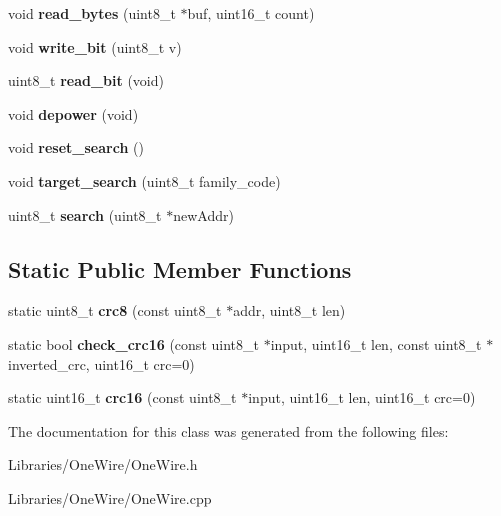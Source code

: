\begin{DoxyCompactItemize}
\item 
\hypertarget{class_one_wire_a2407440e8e25b624617593f8ad6447d4}{}void {\bfseries read\+\_\+bytes} (uint8\+\_\+t $\ast$buf, uint16\+\_\+t count)\label{class_one_wire_a2407440e8e25b624617593f8ad6447d4}

\item 
\hypertarget{class_one_wire_a6bbc58276d1cb08653dab3ea35378f94}{}void {\bfseries write\+\_\+bit} (uint8\+\_\+t v)\label{class_one_wire_a6bbc58276d1cb08653dab3ea35378f94}

\item 
\hypertarget{class_one_wire_aeae4c2798b70d9d0ba3091c03ee2d056}{}uint8\+\_\+t {\bfseries read\+\_\+bit} (void)\label{class_one_wire_aeae4c2798b70d9d0ba3091c03ee2d056}

\item 
\hypertarget{class_one_wire_aa8e0f62e830ad05d8035e55c7a309256}{}void {\bfseries depower} (void)\label{class_one_wire_aa8e0f62e830ad05d8035e55c7a309256}

\item 
\hypertarget{class_one_wire_aae5efdf67928b5ee312ab7d7906416fa}{}void {\bfseries reset\+\_\+search} ()\label{class_one_wire_aae5efdf67928b5ee312ab7d7906416fa}

\item 
\hypertarget{class_one_wire_a0a1b8457adb609a693b865dd474e5116}{}void {\bfseries target\+\_\+search} (uint8\+\_\+t family\+\_\+code)\label{class_one_wire_a0a1b8457adb609a693b865dd474e5116}

\item 
\hypertarget{class_one_wire_a383dc74fc9f8a27b76366a2859c3820a}{}uint8\+\_\+t {\bfseries search} (uint8\+\_\+t $\ast$new\+Addr)\label{class_one_wire_a383dc74fc9f8a27b76366a2859c3820a}

\end{DoxyCompactItemize}
\subsection*{Static Public Member Functions}
\begin{DoxyCompactItemize}
\item 
\hypertarget{class_one_wire_ae3486a669581b750e4fdf3f3a12b05f1}{}static uint8\+\_\+t {\bfseries crc8} (const uint8\+\_\+t $\ast$addr, uint8\+\_\+t len)\label{class_one_wire_ae3486a669581b750e4fdf3f3a12b05f1}

\item 
\hypertarget{class_one_wire_a089c502d26caca5214264261db82d011}{}static bool {\bfseries check\+\_\+crc16} (const uint8\+\_\+t $\ast$input, uint16\+\_\+t len, const uint8\+\_\+t $\ast$inverted\+\_\+crc, uint16\+\_\+t crc=0)\label{class_one_wire_a089c502d26caca5214264261db82d011}

\item 
\hypertarget{class_one_wire_a685131803ff9bd250926de68fb477998}{}static uint16\+\_\+t {\bfseries crc16} (const uint8\+\_\+t $\ast$input, uint16\+\_\+t len, uint16\+\_\+t crc=0)\label{class_one_wire_a685131803ff9bd250926de68fb477998}

\end{DoxyCompactItemize}


The documentation for this class was generated from the following files\+:\begin{DoxyCompactItemize}
\item 
Libraries/\+One\+Wire/One\+Wire.\+h\item 
Libraries/\+One\+Wire/One\+Wire.\+cpp\end{DoxyCompactItemize}
